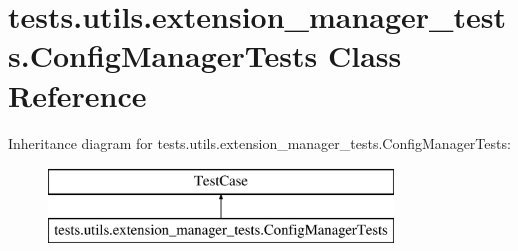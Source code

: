\hypertarget{classtests_1_1utils_1_1extension__manager__tests_1_1ConfigManagerTests}{\section{tests.\-utils.\-extension\-\_\-manager\-\_\-tests.\-Config\-Manager\-Tests Class Reference}
\label{classtests_1_1utils_1_1extension__manager__tests_1_1ConfigManagerTests}
}
Inheritance diagram for tests.\-utils.\-extension\-\_\-manager\-\_\-tests.\-Config\-Manager\-Tests\-:\begin{figure}[H]
\begin{center}
\leavevmode
\includegraphics[height=2.000000cm]{classtests_1_1utils_1_1extension__manager__tests_1_1ConfigManagerTests}
\end{center}
\end{figure}
